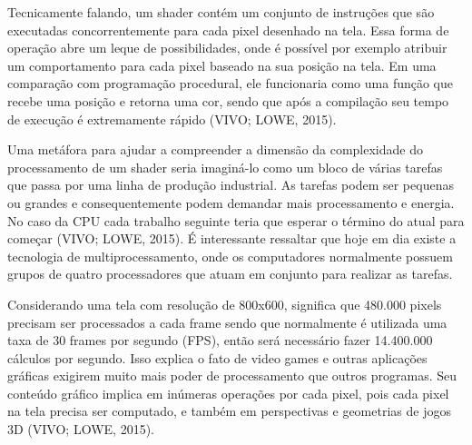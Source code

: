 	\begin{figure}[h!]
		\centering
	\end{figure}
	\nocite{figura5}

Tecnicamente falando, um shader contém um conjunto de instruções que são executadas concorrentemente para cada pixel desenhado na tela. Essa forma de operação abre um leque de possibilidades, onde é possível por exemplo atribuir um comportamento para cada pixel baseado na sua posição na tela. Em uma comparação com programação procedural, ele funcionaria como uma função que recebe uma posição e retorna uma cor, sendo que após a compilação seu tempo de execução é extremamente rápido (VIVO; LOWE, 2015)\nocite{bookOfShaders}.

Uma metáfora para ajudar a compreender a dimensão da complexidade do processamento de um shader seria imaginá-lo como um bloco de várias tarefas que passa por uma linha de produção industrial. As tarefas podem ser pequenas ou grandes e consequentemente podem demandar mais processamento e energia. No caso da CPU cada trabalho seguinte teria que esperar o término do atual para começar (VIVO; LOWE, 2015)\nocite{bookOfShaders}. É interessante ressaltar que hoje em dia existe a tecnologia de multiprocessamento, onde os computadores normalmente possuem grupos de quatro processadores que atuam em conjunto para realizar as tarefas.

Considerando uma tela com resolução de 800x600, significa que 480.000 pixels precisam ser processados a cada frame sendo que normalmente é utilizada uma taxa de 30 frames por segundo (\acrshort{FPS}), então será necessário fazer 14.400.000 cálculos por segundo. Isso explica o fato de video games e outras aplicações gráficas exigirem muito mais poder de processamento que outros programas. Seu conteúdo gráfico implica em inúmeras operações por cada pixel, pois cada pixel na tela precisa ser computado, e também em perspectivas e geometrias de jogos 3D (VIVO; LOWE, 2015)\nocite{bookOfShaders}.  


